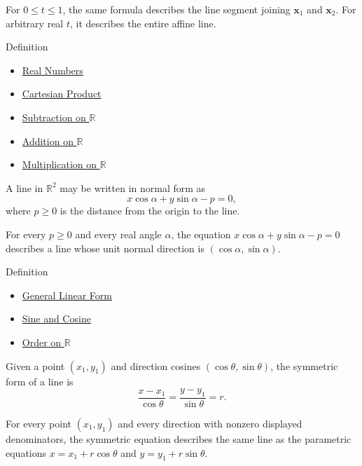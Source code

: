 \begin{remark*}[Interpretation]
For $0\le t\le 1$, the same formula describes the line segment joining
$\mathbf x_1$ and $\mathbf x_2$. For arbitrary real $t$, it describes the
entire affine line.
\end{remark*}

\begin{definitionbox}{Definition}

\begin{dependencies}
\begin{itemize}
  \item \hyperref[def:reals]{Real Numbers}
  \item \hyperref[def:cartesian-product]{Cartesian Product}
  \item \hyperref[def:subtraction-on-r]{Subtraction on $\mathbb{R}$}
  \item \hyperref[def:addition-on-r]{Addition on $\mathbb{R}$}
  \item \hyperref[def:multiplication-on-r]{Multiplication on $\mathbb{R}$}
\end{itemize}
\end{dependencies}
\begin{definition}
\label{def:normal-form-line}
A line in $\mathbb{R}^2$ may be written in normal form as
\[
  x\cos\alpha+y\sin\alpha-p=0,
\]
where $p\ge 0$ is the distance from the origin to the line.
\end{definition}
\end{definitionbox}\begin{remark*}
For every $p\ge 0$ and every real angle $\alpha$, the equation
$x\cos\alpha+y\sin\alpha-p=0$ describes a line whose unit normal direction is
$(\cos\alpha,\sin\alpha)$.
\end{remark*}

\begin{definitionbox}{Definition}

\begin{dependencies}
\begin{itemize}
  \item \hyperref[def:general-linear-form]{General Linear Form}
  \item \hyperref[def:sine-cosine]{Sine and Cosine}
  \item \hyperref[def:order-on-r]{Order on $\mathbb{R}$}
\end{itemize}
\end{dependencies}
\begin{definition}
\label{def:symmetric-form-line}
Given a point $(x_1,y_1)$ and direction cosines
$(\cos\theta,\sin\theta)$, the symmetric form of a line is
\[
  \frac{x-x_1}{\cos\theta}
  =
  \frac{y-y_1}{\sin\theta}
  =
  r.
\]
\end{definition}
\end{definitionbox}\begin{remark*}
For every point $(x_1,y_1)$ and every direction with nonzero displayed
denominators, the symmetric equation describes the same line as the
parametric equations
$x=x_1+r\cos\theta$ and $y=y_1+r\sin\theta$.
\end{remark*}

